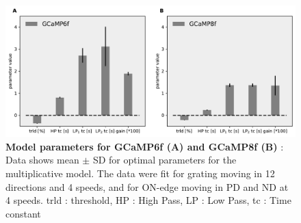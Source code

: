 \documentclass[9pt,lineno]{elife}
\begin{document}
\begin{figure}
\begin{fullwidth}
\includegraphics[width=0.84\linewidth]{figure6}
\caption{\textbf{Model parameters for GCaMP6f (A) and GCaMP8f (B)} : Data shows mean $\pm$ SD for optimal parameters for the multiplicative model. The data were fit for grating moving in 12 directions and 4 speeds, and for ON-edge moving in PD and ND at 4 speeds. trld : threshold, HP : High Pass, LP : Low Pass, tc : Time constant}

\label{gcampcomparison}
	
\end{fullwidth}
\end{figure} 
\end{document}

